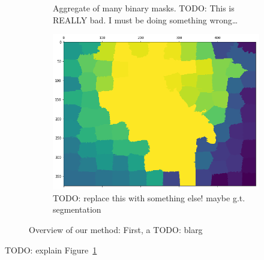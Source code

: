 \documentclass[twocolumn]{article}
\newcommand{\todo}[1]{}
\renewcommand{\todo}[1]{{\color{red} TODO: {#1}}}
\newcommand{\figref}[1]{Figure~\ref{fig:#1}}
\newcommand{\figlab}[1]{\label{fig:#1}}
\begin{document}
\begin{figure}[t]
\begin{subfigure}{0.49\linewidth}
    \caption{Aggregate of many binary masks. \todo{This is REALLY bad. I must be doing something wrong\ldots}}
  \end{subfigure}
  \begin{subfigure}{0.49\linewidth}
    \includegraphics[width=\linewidth]{figs/aggregate.png}
    \caption{\todo{replace this with something else! maybe g.t. segmentation}}
  \end{subfigure}

  \caption{
    Overview of our method: First, a \todo{blarg}
  }
  \figlab{process}

\end{figure}

\todo{explain \figref{process}}
\end{document}
